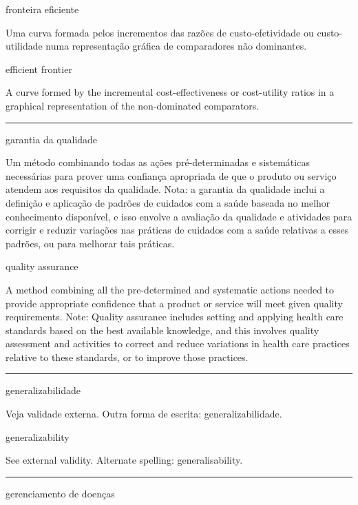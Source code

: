 \documentclass[
  openany]{book}
\begin{document}
fronteira eficiente

Uma curva formada pelos incrementos das razões de custo-efetividade ou custo-utilidade numa representação gráfica de comparadores não dominantes.

efficient frontier

A curve formed by the incremental cost-effectiveness or cost-utility ratios in a graphical representation of the non-dominated comparators.

\begin{center}\rule{0.5\linewidth}{0.5pt}\end{center}

garantia da qualidade

Um método combinando todas as ações pré-determinadas e sistemáticas necessárias para prover uma confiança apropriada de que o produto ou serviço atendem aos requisitos da qualidade. Nota: a garantia da qualidade inclui a definição e aplicação de padrões de cuidados com a saúde baseada no melhor conhecimento disponível, e isso envolve a avaliação da qualidade e atividades para corrigir e reduzir variações nas práticas de cuidados com a saúde relativas a esses padrões, ou para melhorar tais práticas.

quality assurance

A method combining all the pre-determined and systematic actions needed to provide appropriate confidence that a product or service will meet given quality requirements. Note: Quality assurance includes setting and applying health care standards based on the best available knowledge, and this involves quality assessment and activities to correct and reduce variations in health care practices relative to these standards, or to improve those practices.

\begin{center}\rule{0.5\linewidth}{0.5pt}\end{center}

generalizabilidade

Veja validade externa. Outra forma de escrita: generalizabilidade.

generalizability

See external validity. Alternate spelling: generalisability.

\begin{center}\rule{0.5\linewidth}{0.5pt}\end{center}

gerenciamento de doenças
\end{document}
